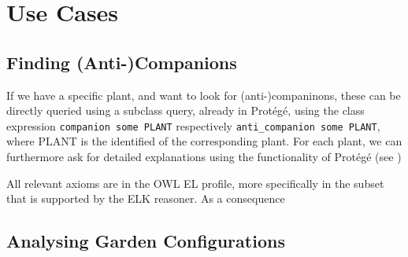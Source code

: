 \section{Use Cases}

\subsection{Finding (Anti-)Companions}

If we have a specific plant, and want to look for (anti-)companinons, these can be
directly queried using a subclass query, already in Prot\'eg\'e, using the class expression
\verb|companion some PLANT| respectively \verb|anti_companion some PLANT|, where PLANT is
the identified of the corresponding plant. For each plant, we can furthermore ask for detailed
explanations using the functionality of Prot\'eg\'e (see )

All relevant axioms are in the OWL EL profile, more
specifically in the subset that is supported by the ELK reasoner. As a consequence

\subsection{Analysing Garden Configurations}
